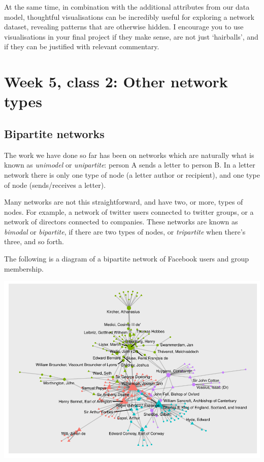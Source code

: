 \documentclass[
]{book}
\begin{document}
At the same time, in combination with the additional attributes from our data model, thoughtful visualisations can be incredibly useful for exploring a network dataset, revealing patterns that are otherwise hidden. I encourage you to use visualisations in your final project if they make sense, are not just `hairballs', and if they can be justified with relevant commentary.

\hypertarget{week-5-class-2-other-network-types}{%
\chapter{Week 5, class 2: Other network types}\label{week-5-class-2-other-network-types}}

\hypertarget{bipartite-networks-1}{%
\section{Bipartite networks}\label{bipartite-networks-1}}

The work we have done so far has been on networks which are naturally what is known as \emph{unimodel} or \emph{unipartite}: person A sends a letter to person B. In a letter network there is only one type of node (a letter author or recipient), and one type of node (sends/receives a letter).

Many networks are not this straightforward, and have two, or more, types of nodes. For example, a network of twitter users connected to twitter groups, or a network of directors connected to companies. These networks are known as \emph{bimodal} or \emph{bipartite}, if there are two types of nodes, or \emph{tripartite} when there's three, and so forth.

The following is a diagram of a bipartite network of Facebook users and group membership.

\includegraphics{_main_files/figure-latex/unnamed-chunk-68-1.pdf}
\end{document}
